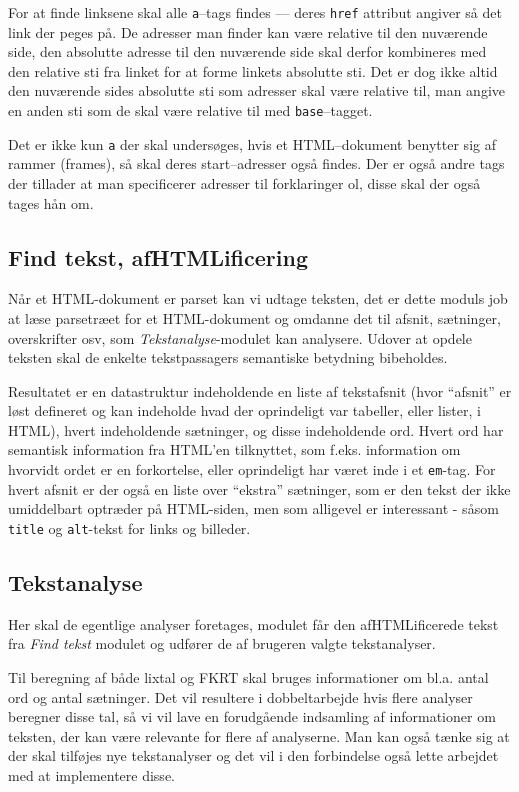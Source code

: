 \documentclass[a4paper,oneside,article, titlepage]{article}
\begin{document}
For at finde linksene skal alle \texttt{a}--tags findes --- deres
\texttt{href} attribut angiver så det link der peges på. De adresser
man finder kan være relative til den nuværende side, den absolutte
adresse til den nuværende side skal derfor kombineres med den relative
sti fra linket for at forme linkets absolutte sti. Det er dog ikke
altid den nuværende sides absolutte sti som adresser skal være
relative til, man angive en anden sti som de skal være relative til
med \texttt{base}--tagget. 

Det er ikke kun \texttt{a} der skal undersøges, hvis et HTML--dokument
benytter sig af rammer (frames), så skal deres start--adresser også
findes. Der er også andre tags der tillader at man specificerer
adresser til forklaringer ol, disse skal der også tages hån om.

\subsection{Find tekst, afHTMLificering}
Når et HTML-dokument er parset kan vi udtage teksten, det er dette
moduls job at læse parsetræet for et HTML-dokument og omdanne det til
afsnit, sætninger, overskrifter osv, som \textit{Tekstanalyse}-modulet
kan analysere. Udover at opdele teksten skal de enkelte tekstpassagers
semantiske betydning bibeholdes.

Resultatet er en datastruktur indeholdende en liste af tekstafsnit
(hvor ``afsnit'' er løst defineret og kan indeholde hvad der
oprindeligt var tabeller, eller lister, i HTML), hvert indeholdende
sætninger, og disse indeholdende ord. Hvert ord har semantisk
information fra HTML'en tilknyttet, som f.eks. information om hvorvidt
ordet er en forkortelse, eller oprindeligt har været inde i et
\texttt{em}-tag. For hvert afsnit er der også en liste over ``ekstra''
sætninger, som er den tekst der ikke umiddelbart optræder på
HTML-siden, men som alligevel er interessant - såsom \texttt{title} og
\texttt{alt}-tekst for links og billeder.

\subsection{Tekstanalyse}
Her skal de egentlige analyser foretages, modulet får den
afHTMLificerede tekst fra \textit{Find tekst} modulet og udfører de
af brugeren valgte tekstanalyser.

Til beregning af både lixtal og FKRT skal bruges informationer om
bl.a. antal ord og antal sætninger. Det vil resultere i dobbeltarbejde
hvis flere analyser beregner disse tal, så vi vil lave en forudgående
indsamling af informationer om teksten, der kan være relevante for
flere af analyserne. Man kan også tænke sig at der skal tilføjes nye
tekstanalyser og det vil i den forbindelse også lette arbejdet med at
implementere disse.
\end{document}
